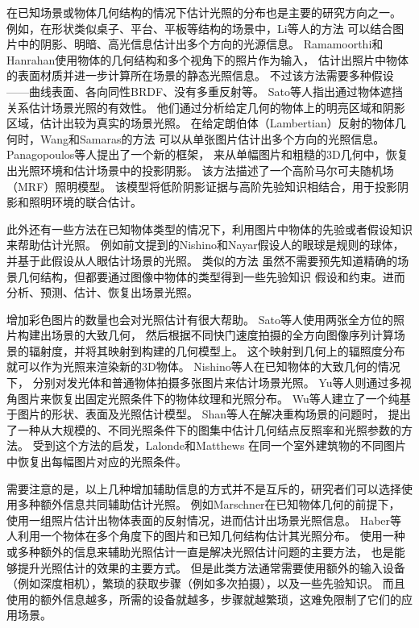 在已知场景或物体几何结构的情况下估计光照的分布也是主要的研究方向之一。
例如，在形状类似桌子、平台、平板等结构的场景中，Li等人\cite{li2003multiple}的方法
可以结合图片中的阴影、明暗、高光信息估计出多个方向的光源信息。
Ramamoorthi和Hanrahan\cite{ramamoorthi2001signal}使用物体的几何结构和多个视角下的照片作为输入，
估计出照片中物体的表面材质并进一步计算所在场景的静态光照信息。
不过该方法需要多种假设——曲线表面、各向同性BRDF、没有多重反射等。
Sato等人\cite{sato2003illumination}指出通过物体遮挡关系估计场景光照的有效性。
他们通过分析给定几何的物体上的明亮区域和阴影区域，估计出较为真实的场景光照。
在给定朗伯体（Lambertian）反射的物体几何时，Wang和Samaras\cite{wang2002estimation}的方法
可以从单张图片估计出多个方向的光照信息。
Panagopoulos等人\cite{panagopoulos2011illumination}提出了一个新的框架，
来从单幅图片和粗糙的3D几何中，恢复出光照环境和估计场景中的投影阴影。
该方法描述了一个高阶马尔可夫随机场（MRF）照明模型。
该模型将低阶阴影证据与高阶先验知识相结合，用于投影阴影和照明环境的联合估计。

此外还有一些方法在已知物体类型的情况下，利用图片中物体的先验或者假设知识来帮助估计光照。
例如前文提到的Nishino和Nayar\cite{nishino2004eyes}假设人的眼球是规则的球体，
并基于此假设从人眼估计场景的光照。
类似的方法\cite{barron2015shape, lopez2010compositing, rematas2016deep}
虽然不需要预先知道精确的场景几何结构，但都要通过图像中物体的类型得到一些先验知识
假设和约束。进而分析、预测、估计、恢复出场景光照。

增加彩色图片的数量也会对光照估计有很大帮助。
Sato等人\cite{sato1999acquiring}使用两张全方位的照片构建出场景的大致几何，
然后根据不同快门速度拍摄的全方向图像序列计算场景的辐射度，并将其映射到构建的几何模型上。
这个映射到几何上的辐照度分布就可以作为光照来渲染新的3D物体。
Nishino等人\cite{nishino2001determining, nishino2005re}在已知物体的大致几何的情况下，
分别对发光体和普通物体拍摄多张图片来估计场景光照。
Yu等人\cite{yu2006sparse}则通过多视角图片来恢复出固定光照条件下的物体纹理和光照分布。
Wu等人\cite{wu2011high}建立了一个纯基于图片的形状、表面及光照估计模型。
Shan等人\cite{shan2013visual}在解决重构场景的问题时，
提出了一种从大规模的、不同光照条件下的图集中估计几何结点反照率和光照参数的方法。
受到这个方法的启发，Lalonde和Matthews\cite{lalonde2014lighting}
在同一个室外建筑物的不同图片中恢复出每幅图片对应的光照条件。

需要注意的是，以上几种增加辅助信息的方式并不是互斥的，研究者们可以选择使用多种额外信息共同辅助估计光照。
例如Marschner\cite{marschner1997inverse}在已知物体几何的前提下，
使用一组照片估计出物体表面的反射情况，进而估计出场景光照信息。
Haber等人\cite{haber2009relighting}利用一个物体在多个角度下的图片和已知几何结构估计其光照分布。
使用一种或多种额外的信息来辅助光照估计一直是解决光照估计问题的主要方法，
也是能够提升光照估计的效果的主要方式。
但是此类方法通常需要使用额外的输入设备（例如深度相机），繁琐的获取步骤（例如多次拍摄），以及一些先验知识。
而且使用的额外信息越多，所需的设备就越多，步骤就越繁琐，这难免限制了它们的应用场景。


